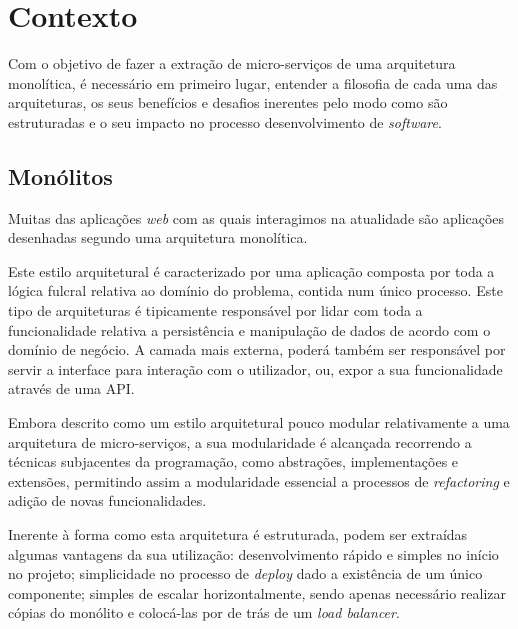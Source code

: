 \chapter{Contexto}

    Com o objetivo de fazer a extração de micro-serviços de uma arquitetura monolítica, é necessário em primeiro lugar, entender a filosofia de cada uma das arquiteturas, os seus benefícios e desafios inerentes pelo modo como são estruturadas e o seu impacto no processo desenvolvimento de \textit{software}.

\section{Monólitos}

    Muitas das aplicações \textit{web} com as quais interagimos na atualidade são aplicações desenhadas segundo uma arquitetura monolítica. 
    
    Este estilo arquitetural é caracterizado por uma aplicação composta por toda a lógica fulcral relativa ao domínio do problema, contida num único processo. Este tipo de arquiteturas é tipicamente responsável por lidar com toda a funcionalidade relativa a persistência e manipulação de dados de acordo com o domínio de negócio. A camada mais externa, poderá também ser responsável por servir a interface para interação com o utilizador, ou, expor a sua funcionalidade através de uma API.
    
    Embora descrito como um estilo arquitetural pouco modular relativamente a uma arquitetura de micro-serviços, a sua modularidade é alcançada recorrendo a técnicas subjacentes da programação, como abstrações, implementações e extensões, permitindo assim a modularidade essencial a processos de \textit{refactoring} e adição de novas funcionalidades.
    
    Inerente à forma como esta arquitetura é estruturada, podem ser extraídas algumas vantagens da sua utilização: desenvolvimento rápido e simples no início no projeto; simplicidade no processo de \textit{deploy} dado a existência de um único componente; simples de escalar horizontalmente, sendo apenas necessário realizar cópias do monólito e colocá-las por de trás de um \textit{load balancer}.
   

